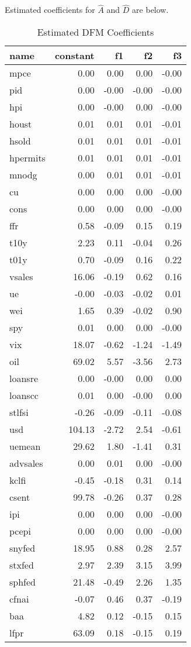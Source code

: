 \documentclass[11pt, letterpaper]{article}\usepackage[]{graphicx}\usepackage[]{color}
\begin{document}
Estimated coefficients for $\widehat{A}$ and $\widehat{D}$ are below.
\begin{table}[H]
\centering
\begingroup\footnotesize
\begin{tabular}{lrrrr}
  \hline
name & constant & f1 & f2 & f3 \\ 
  \hline
mpce & 0.00 & 0.00 & 0.00 & -0.00 \\ 
  pid & 0.00 & -0.00 & -0.00 & -0.00 \\ 
  hpi & 0.00 & -0.00 & 0.00 & -0.00 \\ 
  houst & 0.01 & 0.01 & 0.01 & -0.01 \\ 
  hsold & 0.01 & 0.01 & 0.01 & -0.01 \\ 
  hpermits & 0.01 & 0.01 & 0.01 & -0.01 \\ 
  mnodg & 0.00 & 0.01 & 0.01 & -0.01 \\ 
  cu & 0.00 & 0.00 & 0.00 & -0.00 \\ 
  cons & 0.00 & 0.00 & 0.00 & -0.00 \\ 
  ffr & 0.58 & -0.09 & 0.15 & 0.19 \\ 
  t10y & 2.23 & 0.11 & -0.04 & 0.26 \\ 
  t01y & 0.70 & -0.09 & 0.16 & 0.22 \\ 
  vsales & 16.06 & -0.19 & 0.62 & 0.16 \\ 
  ue & -0.00 & -0.03 & -0.02 & 0.01 \\ 
  wei & 1.65 & 0.39 & -0.02 & 0.90 \\ 
  spy & 0.01 & 0.00 & 0.00 & -0.00 \\ 
  vix & 18.07 & -0.62 & -1.24 & -1.49 \\ 
  oil & 69.02 & 5.57 & -3.56 & 2.73 \\ 
  loansre & 0.00 & -0.00 & 0.00 & 0.00 \\ 
  loanscc & 0.01 & 0.00 & -0.00 & 0.00 \\ 
  stlfsi & -0.26 & -0.09 & -0.11 & -0.08 \\ 
  usd & 104.13 & -2.72 & 2.54 & -0.61 \\ 
  uemean & 29.62 & 1.80 & -1.41 & 0.31 \\ 
  advsales & 0.00 & 0.01 & 0.00 & -0.00 \\ 
  kclfi & -0.45 & -0.18 & 0.31 & 0.14 \\ 
  csent & 99.78 & -0.26 & 0.37 & 0.28 \\ 
  ipi & 0.00 & 0.00 & 0.00 & -0.00 \\ 
  pcepi & 0.00 & 0.00 & 0.00 & -0.00 \\ 
  snyfed & 18.95 & 0.88 & 0.28 & 2.57 \\ 
  stxfed & 2.97 & 2.39 & 3.15 & 3.99 \\ 
  sphfed & 21.48 & -0.49 & 2.26 & 1.35 \\ 
  cfnai & -0.07 & 0.46 & 0.37 & -0.19 \\ 
  baa & 4.82 & 0.12 & -0.15 & 0.15 \\ 
  lfpr & 63.09 & 0.18 & -0.15 & 0.19 \\ 
   \hline
\end{tabular}
\endgroup
\caption{Estimated DFM Coefficients} 
\end{table}
\end{document}
